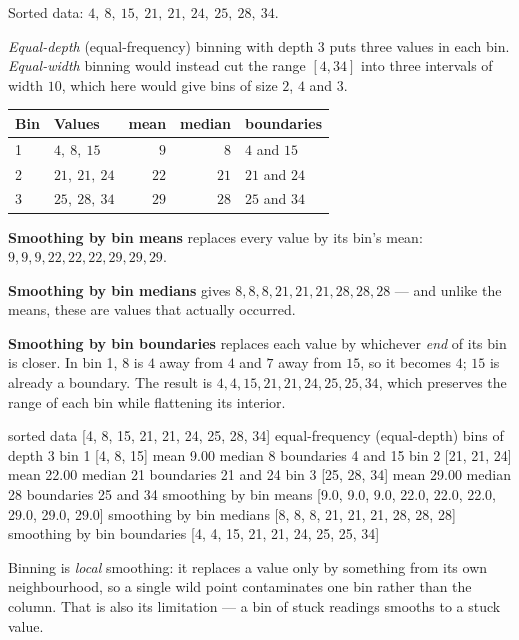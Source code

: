 \documentclass[11pt]{article}
\begin{document}
\begin{worked}
Sorted data: $4,\ 8,\ 15,\ 21,\ 21,\ 24,\ 25,\ 28,\ 34$.

\emph{Equal-depth} (equal-frequency) binning with depth $3$ puts three values
in each bin. \emph{Equal-width} binning would instead cut the range
$[4, 34]$ into three intervals of width $10$, which here would give bins of
size $2$, $4$ and $3$.

\begin{center}
\begin{tabular}{@{}llrrl@{}}
\toprule
Bin & Values & mean & median & boundaries\\
\midrule
1 & $4,\ 8,\ 15$   & $9$  & $8$  & $4$ and $15$\\
2 & $21,\ 21,\ 24$ & $22$ & $21$ & $21$ and $24$\\
3 & $25,\ 28,\ 34$ & $29$ & $28$ & $25$ and $34$\\
\bottomrule
\end{tabular}
\end{center}

\textbf{Smoothing by bin means} replaces every value by its bin's mean:
$9, 9, 9, 22, 22, 22, 29, 29, 29$.

\textbf{Smoothing by bin medians} gives $8, 8, 8, 21, 21, 21, 28, 28, 28$ ---
and unlike the means, these are values that actually occurred.

\textbf{Smoothing by bin boundaries} replaces each value by whichever
\emph{end} of its bin is closer. In bin 1, $8$ is $4$ away from $4$ and $7$
away from $15$, so it becomes $4$; $15$ is already a boundary. The result is
$4, 4, 15, 21, 21, 24, 25, 25, 34$, which preserves the range of each bin while
flattening its interior.
\end{worked}

\begin{codeout}
sorted data  [4, 8, 15, 21, 21, 24, 25, 28, 34]
equal-frequency (equal-depth) bins of depth 3
  bin 1  [4, 8, 15]     mean  9.00   median  8   boundaries  4 and 15
  bin 2  [21, 21, 24]   mean 22.00   median 21   boundaries 21 and 24
  bin 3  [25, 28, 34]   mean 29.00   median 28   boundaries 25 and 34
smoothing by bin means       [9.0, 9.0, 9.0, 22.0, 22.0, 22.0, 29.0, 29.0, 29.0]
smoothing by bin medians     [8, 8, 8, 21, 21, 21, 28, 28, 28]
smoothing by bin boundaries  [4, 4, 15, 21, 21, 24, 25, 25, 34]
\end{codeout}

Binning is \emph{local} smoothing: it replaces a value only by something from
its own neighbourhood, so a single wild point contaminates one bin rather than
the column. That is also its limitation --- a bin of stuck readings smooths to
a stuck value.
\end{document}
